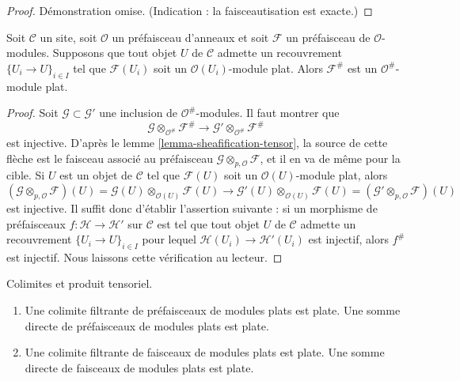 \begin{proof}

Démonstration omise. (Indication : la faisceautisation est exacte.)

\end{proof}

\begin{lemma}

\label{lemma-flatness-sheafification-refined}
Soit $\mathcal{C}$ un site, soit $\mathcal{O}$ un préfaisceau d'anneaux
et soit $\mathcal{F}$ un préfaisceau de $\mathcal{O}$-modules. Supposons
que tout objet $U$ de $\mathcal{C}$ admette un recouvrement
$\{U_i \to U\}_{i \in I}$ tel que $\mathcal{F}(U_i)$ soit un
$\mathcal{O}(U_i)$-module plat. Alors $\mathcal{F}^\#$ est un
$\mathcal{O}^\#$-module plat.
\end{lemma}

\begin{proof}

Soit $\mathcal{G} \subset \mathcal{G}'$ une inclusion de
$\mathcal{O}^\#$-modules. Il faut montrer que
$$
\mathcal{G} \otimes_{\mathcal{O}^\#} \mathcal{F}^\#
\longrightarrow
\mathcal{G}' \otimes_{\mathcal{O}^\#} \mathcal{F}^\#
$$
est injective. D'après le lemme \ref{lemma-sheafification-tensor},
la source de cette flèche est le faisceau associé au préfaisceau
$\mathcal{G} \otimes_{p, \mathcal{O}} \mathcal{F}$,
et il en va de même pour la cible. Si $U$ est un objet de $\mathcal{C}$ tel que
$\mathcal{F}(U)$ soit un $\mathcal{O}(U)$-module plat, alors
$$
(\mathcal{G} \otimes_{p, \mathcal{O}} \mathcal{F})(U) =
\mathcal{G}(U) \otimes_{\mathcal{O}(U)} \mathcal{F}(U)
\longrightarrow
\mathcal{G}'(U) \otimes_{\mathcal{O}(U)} \mathcal{F}(U) =
(\mathcal{G}' \otimes_{p, \mathcal{O}} \mathcal{F})(U)
$$
est injective. Il suffit donc d'établir l'assertion suivante : si un morphisme
de préfaisceaux $f : \mathcal{H} \to \mathcal{H}'$ sur $\mathcal{C}$ est tel
que tout objet $U$ de $\mathcal{C}$ admette un recouvrement
$\{U_i \to U\}_{i \in I}$ pour lequel
$\mathcal{H}(U_i) \to \mathcal{H}'(U_i)$ est injectif, alors $f^\#$ est
injectif. Nous laissons cette vérification au lecteur.

\end{proof}

\begin{lemma}

\label{lemma-colimits-flat}
Colimites et produit tensoriel.
\begin{enumerate}
\item Une colimite filtrante de préfaisceaux de modules plats est plate.
Une somme directe de préfaisceaux de modules plats est plate.
\item Une colimite filtrante de faisceaux de modules plats est plate.
Une somme directe de faisceaux de modules plats est plate.
\end{enumerate}

\end{lemma}

